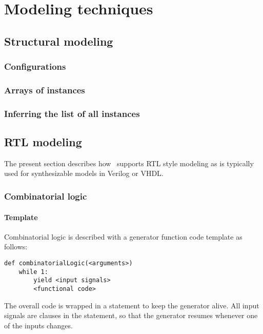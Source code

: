 \chapter{Modeling techniques \label{model}}

\section{Structural modeling \label{model-structure}}

\subsection{Configurations \label{model-conf}}

\subsection{Arrays of instances \label{model-instarray}}

\subsection{Inferring the list of all instances \label{model-infer-instlist}}

\section{RTL modeling \label{model-rtl}}
The present section describes how \myhdl\ supports RTL style modeling
as is typically used for synthesizable models in Verilog or VHDL. 

\subsection{Combinatorial logic \label{model-comb}}

\subsubsection{Template \label{model-comb-templ}}

Combinatorial logic is described with a generator function code template as
follows: 

\begin{verbatim}
def combinatorialLogic(<arguments>)
    while 1:
        yield <input signals>
        <functional code>
\end{verbatim}

The overall code is wrapped in a  statement to keep the
generator alive. All input signals are clauses in the 
statement, so that the generator resumes whenever one of the inputs
changes.

